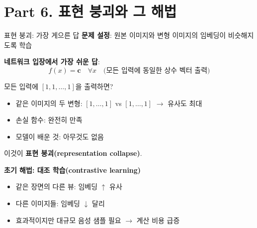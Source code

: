\documentclass[aspectratio=169,10pt]{beamer}
\begin{document}
\section{Part 6. 표현 붕괴와 그 해법}

\begin{frame}{표현 붕괴: 가장 게으른 답}
\textbf{문제 설정}: 원본 이미지와 변형 이미지의 임베딩이 비슷해지도록 학습

\vspace{0.3em}
\textbf{네트워크 입장에서 가장 쉬운 답}:
\[
f(x) = \mathbf{c} \quad \forall x \quad \text{(모든 입력에 동일한 상수 벡터 출력)}
\]

모든 입력에 $[1, 1, \ldots, 1]$을 출력하면?
\begin{itemize}
  \item 같은 이미지의 두 변형: $[1,\ldots,1]$ vs $[1,\ldots,1]$ $\to$ 유사도 최대
  \item 손실 함수: 완전히 만족
  \item 모델이 배운 것: \alert{아무것도 없음}
\end{itemize}

\vspace{0.3em}
이것이 \textbf{표현 붕괴(representation collapse)}.

\vspace{0.4em}
\textbf{초기 해법: 대조 학습(contrastive learning)}
\begin{itemize}
  \item 같은 장면의 다른 뷰: 임베딩 $\uparrow$ 유사
  \item \alert{다른 이미지들}: 임베딩 $\downarrow$ 달리
  \item 효과적이지만 대규모 음성 샘플 필요 $\to$ 계산 비용 급증
\end{itemize}
\end{frame}
\end{document}
